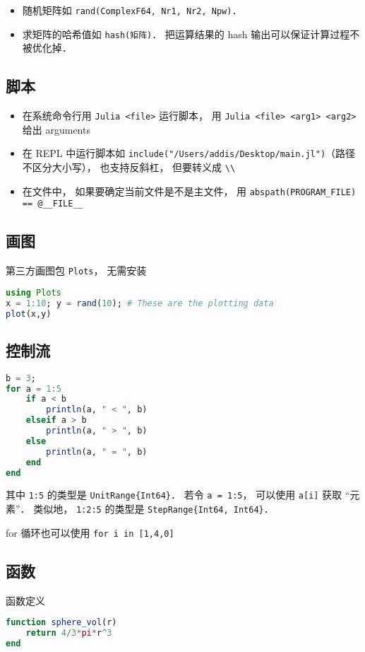 \begin{itemize}
\item 随机矩阵如 \verb|rand(ComplexF64, Nr1, Nr2, Npw)|．
\item 求矩阵的哈希值如 \verb|hash(矩阵)|． 把运算结果的 hash 输出可以保证计算过程不被优化掉．
\end{itemize}

\subsection{脚本}
\begin{itemize}
\item 在系统命令行用 \verb|Julia <file>| 运行脚本， 用 \verb|Julia <file> <arg1> <arg2>| 给出 arguments
\item 在 REPL 中运行脚本如 \verb|include("/Users/addis/Desktop/main.jl")|（路径不区分大小写）， 也支持反斜杠， 但要转义成 \verb|\\|
\item 在文件中， 如果要确定当前文件是不是主文件， 用 \verb|abspath(PROGRAM_FILE) == @__FILE__|
\end{itemize}

\subsection{画图}
第三方画图包 \verb|Plots|， 无需安装
\begin{lstlisting}[language=Julia]
using Plots
x = 1:10; y = rand(10); # These are the plotting data
plot(x,y)
\end{lstlisting}

\subsection{控制流}
\begin{lstlisting}[language=Julia]
b = 3;
for a = 1:5
    if a < b
        println(a, " < ", b)
    elseif a > b
        println(a, " > ", b)
    else
        println(a, " = ", b)
    end
end
\end{lstlisting}
其中 \verb|1:5| 的类型是 \verb|UnitRange{Int64}|． 若令 \verb|a = 1:5|， 可以使用 \verb|a[i]| 获取 “元素”． 类似地， \verb|1:2:5| 的类型是 \verb|StepRange{Int64, Int64}|．

for 循环也可以使用 \verb|for i in [1,4,0]|

\subsection{函数}
函数定义
\begin{lstlisting}[language=julia]
function sphere_vol(r)
    return 4/3*pi*r^3
end
\end{lstlisting}

